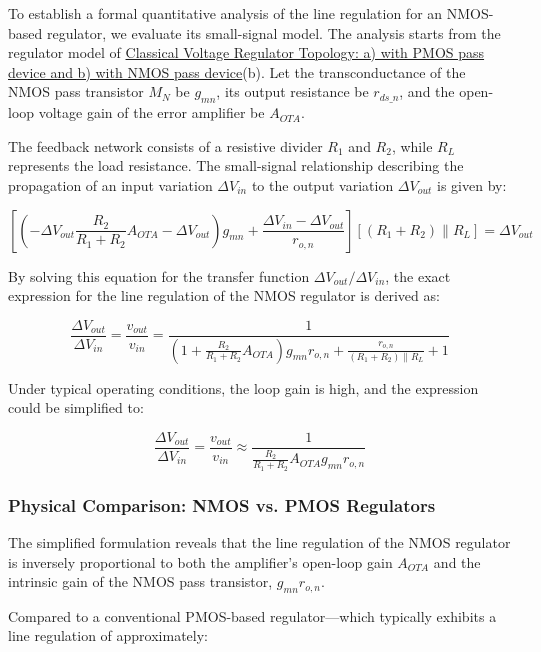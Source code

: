 \documentclass[
]{article}
\begin{document}
To establish a formal quantitative analysis of the line regulation for
an NMOS-based regulator, we evaluate its small-signal model. The
analysis starts from the regulator model of
\hyperref[classical_voltage_reg_topologies_nmos_and_pmos_pass_devices]{Classical
Voltage Regulator Topology: a) with PMOS pass device and b) with NMOS
pass device}(b). Let the transconductance of the NMOS pass transistor
\(M_N\) be \(g_{mn}\), its output resistance be \(r_{ds\_n}\), and the
open-loop voltage gain of the error amplifier be \(A_{OTA}\).

The feedback network consists of a resistive divider \(R_1\) and
\(R_2\), while \(R_L\) represents the load resistance. The small-signal
relationship describing the propagation of an input variation
\(\Delta V_{in}\) to the output variation \(\Delta V_{out}\) is given
by:

\[\left[ \left( -\Delta V_{out} \frac{R_2}{R_1 + R_2} A_{OTA} - \Delta V_{out} \right) g_{mn} + \frac{\Delta V_{in} - \Delta V_{out}}{r_{o,n}} \right] \left[ (R_1 + R_2) \parallel R_L \right] = \Delta V_{out}\]

By solving this equation for the transfer function
\(\Delta V_{out} / \Delta V_{in}\), the exact expression for the line
regulation of the NMOS regulator is derived as:

\[\frac{\Delta V_{out}}{\Delta V_{in}} = \frac{v_{out}}{v_{in}} = \frac{1}{\left(1 + \frac{R_2}{R_1 + R_2} A_{OTA}\right) g_{mn} r_{o,n} + \frac{r_{o,n}}{(R_1 + R_2) \parallel R_L} + 1}\]

Under typical operating conditions, the loop gain is high, and the
expression could be simplified to:

\[\frac{\Delta V_{out}}{\Delta V_{in}} = \frac{v_{out}}{v_{in}} \approx \frac{1}{\frac{R_2}{R_1 + R_2} A_{OTA} g_{mn} r_{o,n}}\]

\subsubsection{Physical Comparison: NMOS vs. PMOS
Regulators}\label{_physical_comparison_nmos_vs_pmos_regulators}

The simplified formulation reveals that the line regulation of the NMOS
regulator is inversely proportional to both the amplifier's open-loop
gain \(A_{OTA}\) and the intrinsic gain of the NMOS pass transistor,
\(g_{mn} r_{o,n}\).

Compared to a conventional PMOS-based regulator---which typically
exhibits a line regulation of approximately:
\end{document}

